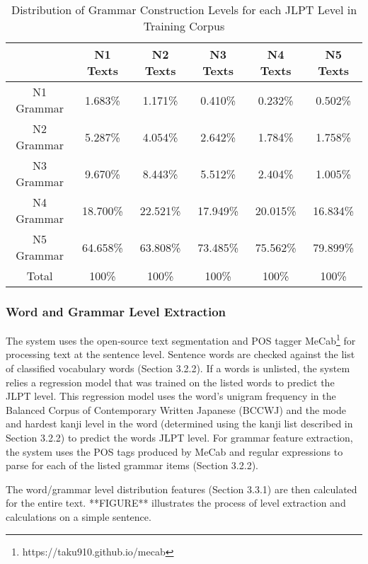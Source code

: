 \documentclass[12pt, a4paper]{article}
\begin{document}
\begin{table}[h!]
    \begin{center}
        \begin{tabular}{|c|c|c|c|c|c|}
            \hline
                     & N1 Texts & N2 Texts & N3 Texts & N4 Texts & N5 Texts \\ \hline
            N1 Grammar & 1.683\%  & 1.171\%  & 0.410\%  &   0.232\%&  0.502\%       \\ \hline
            N2 Grammar & 5.287\%  & 4.054\%  &  2.642\% & 1.784\%  &  1.758\%        \\ \hline
            N3 Grammar & 9.670\%  &  8.443\% &  5.512\% & 2.404\%  &  1.005\%        \\ \hline
            N4 Grammar & 18.700\% & 22.521\% & 17.949\% &  20.015\%&  16.834\%          \\ \hline
            N5 Grammar & 64.658\% & 63.808\% & 73.485\% & 75.562\% & 79.899\%         \\ \hline
            Total    &   100\%       &  100\%        &  100\%        &   100\%       &   100\%       \\ \hline
        \end{tabular}
        \caption{Distribution of Grammar Construction Levels for each JLPT Level in Training Corpus}
        \label{tab:table2}
    \end{center}
\end{table}

\subsubsection{Word and Grammar Level Extraction}

The system uses the open-source text segmentation and POS tagger MeCab\footnote[4]{https://taku910.github.io/mecab}
for processing text at the sentence level. Sentence words are checked against the list of classified vocabulary words (Section 3.2.2). 
If a words is unlisted, the system relies a regression model that was trained on the listed words to predict the JLPT level. This
regression model uses the word's unigram frequency in the Balanced Corpus of Contemporary Written Japanese (BCCWJ) and the mode and hardest
kanji level in the word (determined using the kanji list described in Section 3.2.2) to predict the words JLPT level. 
For grammar feature extraction, the system uses the POS tags produced by MeCab and regular expressions to 
parse for each of the listed grammar items (Section 3.2.2). 
\par
The word/grammar level distribution features (Section 3.3.1) are then calculated for the entire text. 
**FIGURE** illustrates the process of level extraction and calculations on a simple sentence. 
\end{document}
